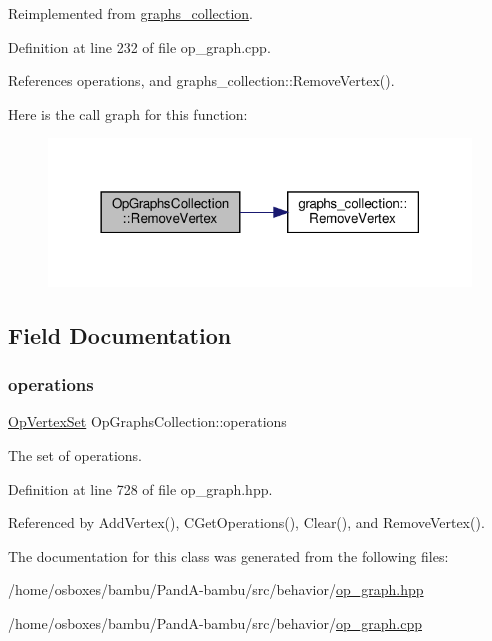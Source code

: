 Reimplemented from \hyperlink{structgraphs__collection_abf3690c3dab1f860b7b0a520b59d0e01}{graphs\+\_\+collection}.



Definition at line 232 of file op\+\_\+graph.\+cpp.



References operations, and graphs\+\_\+collection\+::\+Remove\+Vertex().

Here is the call graph for this function\+:
\nopagebreak
\begin{figure}[H]
\begin{center}
\leavevmode
\includegraphics[width=318pt]{da/df9/classOpGraphsCollection_afb2e5e89d55bac25193625245b7de2fd_cgraph}
\end{center}
\end{figure}


\subsection{Field Documentation}
\mbox{\label{classOpGraphsCollection_a138e24ba0dc9e5006face1e10c0b9aa3}} 
\subsubsection{\texorpdfstring{operations}{operations}}
{\footnotesize\ttfamily \hyperlink{classOpVertexSet}{Op\+Vertex\+Set} Op\+Graphs\+Collection\+::operations\hspace{0.3cm}{\ttfamily [protected]}}



The set of operations. 



Definition at line 728 of file op\+\_\+graph.\+hpp.



Referenced by Add\+Vertex(), C\+Get\+Operations(), Clear(), and Remove\+Vertex().



The documentation for this class was generated from the following files\+:\begin{DoxyCompactItemize}
\item 
/home/osboxes/bambu/\+Pand\+A-\/bambu/src/behavior/\hyperlink{op__graph_8hpp}{op\+\_\+graph.\+hpp}\item 
/home/osboxes/bambu/\+Pand\+A-\/bambu/src/behavior/\hyperlink{op__graph_8cpp}{op\+\_\+graph.\+cpp}\end{DoxyCompactItemize}

